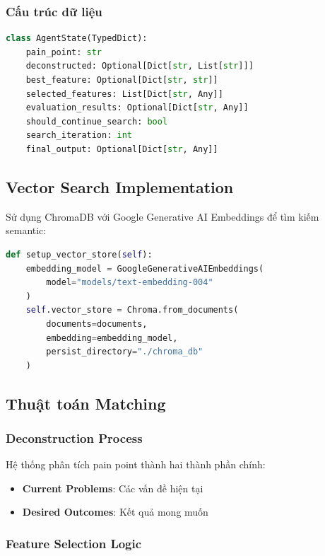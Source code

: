 \documentclass[12pt,a4paper]{article}
\begin{document}
\subsubsection{Cấu trúc dữ liệu}

\begin{lstlisting}[language=Python, caption=Cấu trúc AgentState]
class AgentState(TypedDict):
    pain_point: str
    deconstructed: Optional[Dict[str, List[str]]]
    best_feature: Optional[Dict[str, str]]
    selected_features: List[Dict[str, Any]]
    evaluation_results: Optional[Dict[str, Any]]
    should_continue_search: bool
    search_iteration: int
    final_output: Optional[Dict[str, Any]]
\end{lstlisting}

\subsection{Vector Search Implementation}

Sử dụng ChromaDB với Google Generative AI Embeddings để tìm kiếm semantic:

\begin{lstlisting}[language=Python, caption=Vector Store Setup]
def setup_vector_store(self):
    embedding_model = GoogleGenerativeAIEmbeddings(
        model="models/text-embedding-004"
    )
    self.vector_store = Chroma.from_documents(
        documents=documents,
        embedding=embedding_model,
        persist_directory="./chroma_db"
    )
\end{lstlisting}

\subsection{Thuật toán Matching}

\subsubsection{Deconstruction Process}

Hệ thống phân tích pain point thành hai thành phần chính:

\begin{itemize}
    \item \textbf{Current Problems}: Các vấn đề hiện tại
    \item \textbf{Desired Outcomes}: Kết quả mong muốn
\end{itemize}

\subsubsection{Feature Selection Logic}
\end{document}
